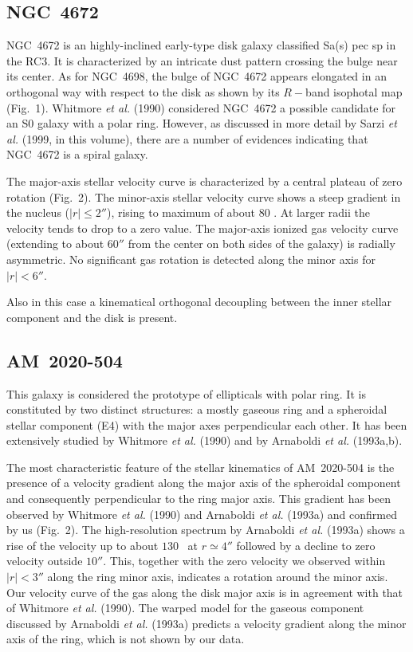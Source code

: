 \subsection{NGC~4672}

NGC~4672 is an highly-inclined early-type disk galaxy classified Sa(s) pec sp
in the RC3.  It is characterized by an intricate dust pattern crossing the
bulge near its center.  As for NGC~4698, the bulge of NGC~4672 appears
elongated in an orthogonal way with respect to the disk as shown by its
$R-$band isophotal map (Fig.~1).  Whitmore {\it et al.\/} (1990) considered
NGC~4672 a possible candidate for an S0 galaxy with a polar ring.  However,
as discussed in more detail by Sarzi {\it et al.\/} (1999, in this volume),
there are a number of evidences indicating that NGC~4672 is a spiral galaxy.

The major-axis stellar velocity curve is characterized by a central plateau
of zero rotation (Fig.~2).  The minor-axis stellar velocity curve shows a
steep gradient in the nucleus ($|r|\leq2''$), rising to maximum of about 80
\kms .  At larger radii the velocity tends to drop to a zero value.  The
major-axis ionized gas velocity curve (extending to about $60''$ from the
center on both sides of the galaxy) is radially asymmetric.  No significant
gas rotation is detected along the minor axis for $|r|<6''$.

Also in this case a kinematical orthogonal decoupling between the inner
stellar component and the disk is present.



\subsection{AM~2020-504}

This galaxy is considered the prototype of ellipticals with polar ring.  It
is constituted by two distinct structures:  a mostly gaseous ring and a
spheroidal stellar component (E4) with the major axes perpendicular each
other.  It has been extensively studied by Whitmore {\it et al.\/} (1990) and
by Arnaboldi {\it et al.\/} (1993a,b).

The most characteristic feature of the stellar kinematics of AM~2020-504 is
the presence of a velocity gradient along the major axis of the spheroidal
component and consequently perpendicular to the ring major axis.  This
gradient has been observed by Whitmore {\it et al.\/} (1990) and Arnaboldi
{\it et al.\/} (1993a) and confirmed by us (Fig.~2).  The high-resolution
spectrum by Arnaboldi {\it et al.\/} (1993a) shows a rise of the velocity up
to about $130$ \kms\ at $r\simeq4''$ followed by a decline to zero velocity
outside $10''$.  This, together with the zero velocity we observed within
$|r|<3''$ along the ring minor axis, indicates a rotation around the minor
axis.  Our velocity curve of the gas along the disk major axis is in
agreement with that of Whitmore {\it et al.\/} (1990).  The warped model for
the gaseous component discussed by Arnaboldi {\it et al.\/} (1993a) predicts
a velocity gradient along the minor axis of the ring, which is not shown by
our data.



